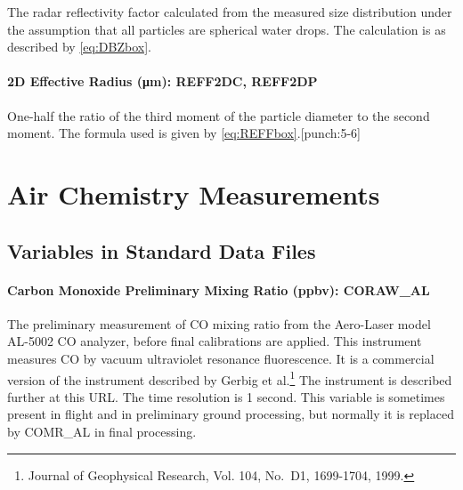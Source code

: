 \documentclass[
  english,
]{book}
\begin{document}
The radar reflectivity factor calculated from the measured size distribution under the assumption that all particles are spherical water drops. The calculation is as described by \eqref{eq:DBZbox}.

\hypertarget{reff2d}{%
\subsubsection*{\texorpdfstring{2D Effective Radius ({μ}m): REFF2DC, REFF2DP}{2D Effective Radius (μm): REFF2DC, REFF2DP}}\label{reff2d}}

One-half the ratio of the third moment of the particle diameter to the second moment. The formula used is given by \eqref{eq:REFFbox}.\protect\hypertarget{punch:5-6}{}{{[}punch:5-6{]}}

\hypertarget{air-chemistry-measurements}{%
\chapter{Air Chemistry Measurements}\label{air-chemistry-measurements}}

\hypertarget{variables-in-standard-data-files}{%
\section{Variables in Standard Data Files}\label{variables-in-standard-data-files}}

\hypertarget{coraw-al}{%
\subsubsection*{Carbon Monoxide Preliminary Mixing Ratio (ppbv): CORAW\_AL}\label{coraw-al}}

The preliminary measurement of CO mixing ratio from the Aero-Laser model AL-5002 CO analyzer, before final calibrations are applied. This instrument measures CO by vacuum ultraviolet resonance fluorescence. It is a commercial version of the instrument described by Gerbig et al.\footnote{Journal of Geophysical Research, Vol. 104, No.~D1, 1699-1704, 1999.}
The instrument is described further at this URL. The time resolution is 1 second. This variable is sometimes present in flight and in preliminary ground processing, but normally it is replaced by COMR\_AL in final processing.
\end{document}
